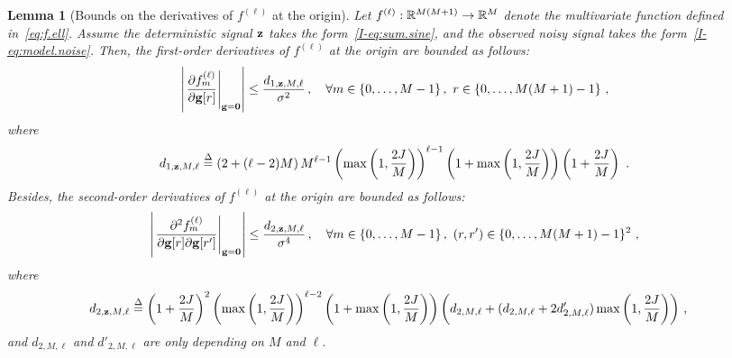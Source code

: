 \documentclass[journal,onecolumn]{IEEEtran}
\newtheorem{lemma}{Lemma}
\begin{document}
\begin{lemma}[Bounds on the derivatives of $f^{(\ell)}$ at the origin]
Let $f^{(\ell)} : {\mathbb R}^{M(M+1)} \to {\mathbb R}^{M}$ denote the multivariate function defined in~\eqref{eq:f.ell}. Assume the deterministic signal ${\mathbf z}$ takes the form~\eqref{I-eq:sum.sine}, and the observed noisy signal takes the form~\eqref{I-eq:model.noise}. Then, the first-order derivatives of $f^{(\ell)}$ at the origin are bounded as follows:  
\begin{equation}
\left|\left.\dfrac{\partial f_m^{(\ell)}}{\partial \bg[r]}\right\vert_{\bg=\bzero}\right| \leq \dfrac{d_{1,\bz,M,\ell}}{\sigma^2}\,,\quad\forall m\in\{0,\ldots,M-1\}\,,\ r\in\{0,\ldots,M(M+1)-1\}\ ,
\label{eq:df.bound}
\end{equation}
where
\[
d_{1,\bz,M,\ell}\defeq \left(2 + (\ell-2)M\right)M^{\ell-1}\left(\max\left(1,\frac{2J}{M}\right)\right)^{\ell-1}\left(1+\max\left(1,\frac{2J}{M}\right)\right)\left(1+\frac{2J}{M}\right)\ .
\]
Besides, the second-order derivatives of $f^{(\ell)}$ at the origin are bounded as follows:  
\begin{equation}
\left|\left.\dfrac{\partial^2 f_m^{(\ell)}}{\partial \bg[r]\partial \bg[r']}\right\vert_{\bg=\bzero}\right| \leq \dfrac{d_{2,\bz,M,\ell}}{\sigma^4}\,,\quad\forall m\in\{0,\ldots,M-1\}\,,\ (r,r')\in\{0,\ldots,M(M+1)-1\}^2\ ,
\label{eq:d2f.bound}
\end{equation}
where 
\begin{align*}
d_{2,{\mathbf z},M,\ell} &\overset{\Delta}{=} \left(1+\frac{2J}{M}\right)^2 \left(\max\left(1,\frac{2J}{M}\right)\right)^{\ell-2}\left(1+\max\left(1,\frac{2J}{M}\right)\right)\left(d_{2,M,\ell} + (d_{2,M,\ell}+2d'_{2,M,\ell})\max\left(1,\frac{2J}{M}\right)\right)\,,
\end{align*}
and $d_{2,M,\ell}$ and $d'_{2,M,\ell}$ are only depending on $M$ and $\ell$.
\end{lemma}
\end{document}
